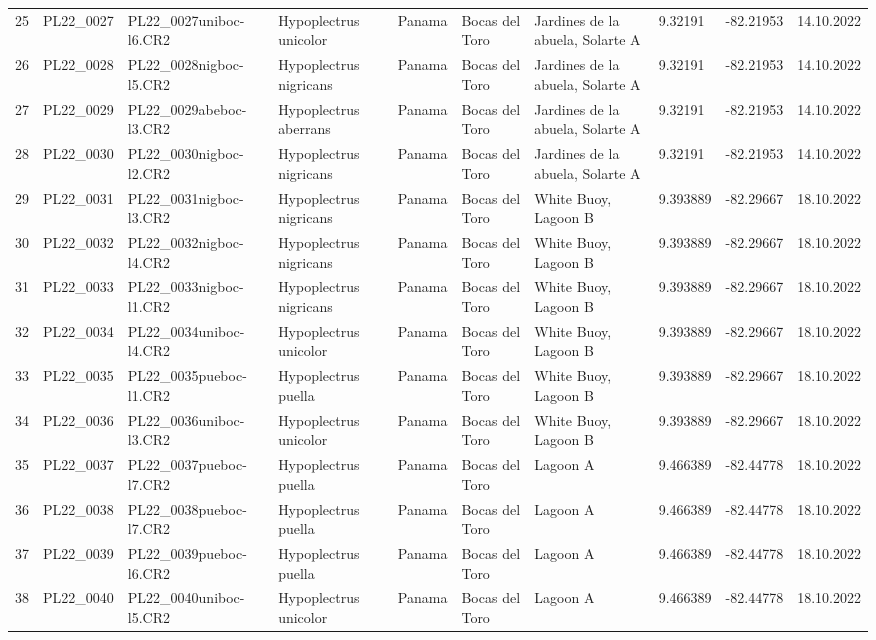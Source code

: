 \begin{table}[ht]
\begin{tabular}{rlllllllll}
  25 & PL22\_0027 & PL22\_0027uniboc-l6.CR2 & Hypoplectrus unicolor & Panama & Bocas del Toro & Jardines de la abuela, Solarte A & 9.32191 & -82.21953 & 14.10.2022 \\ 
  26 & PL22\_0028 & PL22\_0028nigboc-l5.CR2 & Hypoplectrus nigricans  & Panama & Bocas del Toro & Jardines de la abuela, Solarte A & 9.32191 & -82.21953 & 14.10.2022 \\ 
  27 & PL22\_0029 & PL22\_0029abeboc-l3.CR2 & Hypoplectrus aberrans & Panama & Bocas del Toro & Jardines de la abuela, Solarte A & 9.32191 & -82.21953 & 14.10.2022 \\ 
  28 & PL22\_0030 & PL22\_0030nigboc-l2.CR2 & Hypoplectrus nigricans  & Panama & Bocas del Toro & Jardines de la abuela, Solarte A & 9.32191 & -82.21953 & 14.10.2022 \\ 
  29 & PL22\_0031 & PL22\_0031nigboc-l3.CR2 & Hypoplectrus nigricans  & Panama & Bocas del Toro & White Buoy, Lagoon B & 9.393889 & -82.29667 & 18.10.2022 \\ 
  30 & PL22\_0032 & PL22\_0032nigboc-l4.CR2 & Hypoplectrus nigricans  & Panama & Bocas del Toro & White Buoy, Lagoon B & 9.393889 & -82.29667 & 18.10.2022 \\ 
  31 & PL22\_0033 & PL22\_0033nigboc-l1.CR2 & Hypoplectrus nigricans  & Panama & Bocas del Toro & White Buoy, Lagoon B & 9.393889 & -82.29667 & 18.10.2022 \\ 
  32 & PL22\_0034 & PL22\_0034uniboc-l4.CR2 & Hypoplectrus unicolor & Panama & Bocas del Toro & White Buoy, Lagoon B & 9.393889 & -82.29667 & 18.10.2022 \\ 
  33 & PL22\_0035 & PL22\_0035pueboc-l1.CR2 & Hypoplectrus puella & Panama & Bocas del Toro & White Buoy, Lagoon B & 9.393889 & -82.29667 & 18.10.2022 \\ 
  34 & PL22\_0036 & PL22\_0036uniboc-l3.CR2 & Hypoplectrus unicolor & Panama & Bocas del Toro & White Buoy, Lagoon B & 9.393889 & -82.29667 & 18.10.2022 \\ 
  35 & PL22\_0037 & PL22\_0037pueboc-l7.CR2 & Hypoplectrus puella & Panama & Bocas del Toro & Lagoon A & 9.466389 & -82.44778 & 18.10.2022 \\ 
  36 & PL22\_0038 & PL22\_0038pueboc-l7.CR2 & Hypoplectrus puella & Panama & Bocas del Toro & Lagoon A & 9.466389 & -82.44778 & 18.10.2022 \\ 
  37 & PL22\_0039 & PL22\_0039pueboc-l6.CR2 & Hypoplectrus puella & Panama & Bocas del Toro & Lagoon A & 9.466389 & -82.44778 & 18.10.2022 \\ 
  38 & PL22\_0040 & PL22\_0040uniboc-l5.CR2 & Hypoplectrus unicolor & Panama & Bocas del Toro & Lagoon A & 9.466389 & -82.44778 & 18.10.2022 \\ 

\end{tabular}
\end{table}
